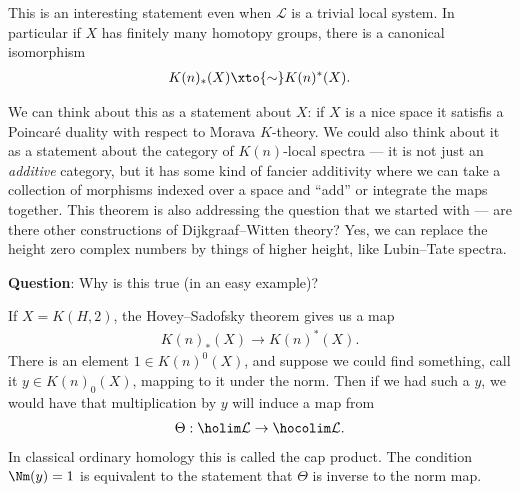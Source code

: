 This is an interesting statement even when $\mathcal{L}$ is a trivial local system. In particular if $X$ has finitely many homotopy groups, there is a canonical isomorphism
\begin{align*}
    K(n)_\ast (X) \xto{\sim} K(n)^\ast(X).
\end{align*}

We can think about this as a statement about $X$: if $X$ is a nice space it satisfis a Poincar\'e duality with respect to Morava $K$-theory. We could also think about it as a statement about the category of $K(n)$-local spectra --- it is not just an \textit{additive} category, but it has some kind of fancier additivity where we can take a collection of morphisms indexed over a space and ``add'' or integrate the maps together. This theorem is also addressing the question that we started with --- are there other constructions of Dijkgraaf--Witten theory? Yes, we can replace the height zero complex numbers by things of higher height, like Lubin--Tate spectra.

\textbf{Question}: Why is this true (in an easy example)?

If $X = K(H,2)$, the Hovey--Sadofsky theorem gives us a map
\begin{align*}
    K(n)_\ast(X) \to K(n)^\ast(X).
\end{align*}
There is an element $1\in K(n)^0(X)$, and suppose we could find something, call it $y\in K(n)_0(X)$, mapping to it under the norm. Then if we had such a $y$, we would have that multiplication by $y$ will induce a map from
\begin{align*}
    \Theta: \holim \mathcal{L} \to \hocolim \mathcal{L}.
\end{align*}
In classical ordinary homology this is called the cap product. The condition $\Nm(y) = 1$ is equivalent to the statement that $\Theta$ is inverse to the norm map.

